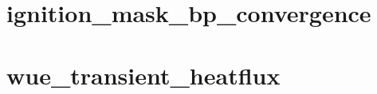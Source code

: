 \clearpage
\section{ignition\_mask\_bp\_convergence}


\clearpage
\section{wue\_transient_heatflux}


